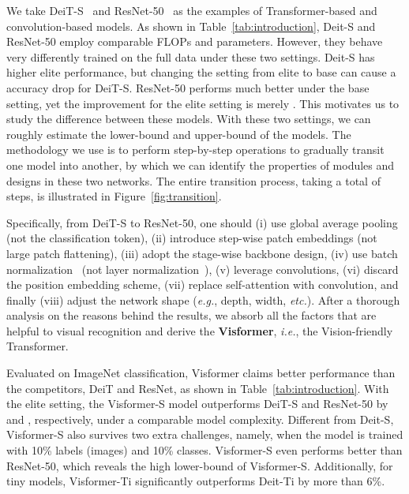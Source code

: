\documentclass[10pt,twocolumn,letterpaper]{article}
\begin{document}
We take DeiT-S~\cite{touvron2020training} and ResNet-50~\cite{he2016deep} as the examples of Transformer-based and convolution-based models. As shown in Table~\ref{tab:introduction}, Deit-S and ResNet-50 employ comparable FLOPs and parameters. However, they behave very differently trained on the full data under these two settings. Deit-S has higher elite performance, but changing the setting from elite to base can cause a  accuracy drop for DeiT-S. ResNet-50 performs much better under the base setting, yet the improvement for the elite setting is merely . This motivates us to study the difference between these models. With these two settings, we can roughly estimate the lower-bound and upper-bound of the models. The methodology we use is to perform step-by-step operations to gradually transit one model into another, by which we can identify the properties of modules and designs in these two networks. The entire transition process, taking a total of  steps, is illustrated in Figure~\ref{fig:transition}.



Specifically, from DeiT-S to ResNet-50, one should (i) use global average pooling (not the classification token), (ii) introduce step-wise patch embeddings (not large patch flattening), (iii) adopt the stage-wise backbone design, (iv) use batch normalization~\cite{ioffe2015batch} (not layer normalization~\cite{ba2016layer}), (v) leverage  convolutions, (vi) discard the position embedding scheme, (vii) replace self-attention with convolution, and finally (viii) adjust the network shape (\textit{e.g.}, depth, width, \textit{etc.}). After a thorough analysis on the reasons behind the results, we absorb all the factors that are helpful to visual recognition and derive the \textbf{Visformer}, \textit{i.e.}, the Vision-friendly Transformer.



Evaluated on ImageNet classification, Visformer claims better performance than the competitors, DeiT and ResNet, as shown in Table~\ref{tab:introduction}. With the elite setting, the Visformer-S model outperforms DeiT-S and ResNet-50 by  and , respectively, under a comparable model complexity. Different from Deit-S, Visformer-S also survives two extra challenges, namely, when the model is trained with 10\% labels (images) and 10\% classes. Visformer-S even performs better than ResNet-50, which reveals the high lower-bound of Visformer-S. Additionally, for tiny models, Visformer-Ti significantly outperforms Deit-Ti by more than 6\%.
\end{document}
